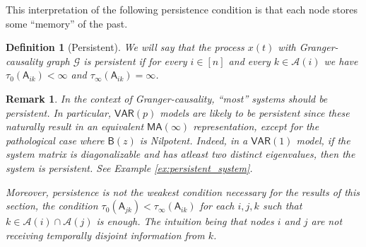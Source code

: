 \documentclass{statsoc}
\def\gcg{\mathcal{G}}  %
\def\VAR{\mathsf{VAR}}  %
\def\B{\mathsf{B}}  %
\def\A{\mathsf{A}}  %
\newcommand{\anc}[1]{\mathcal{A}(#1)}  %
\newtheorem{remark}{Remark}
\newtheorem{definition}{Definition}
\begin{document}
This interpretation of the following persistence condition is that
each node stores some ``memory'' of the past.

\begin{definition}[Persistent]
  We will say that the process $x(t)$ with Granger-causality graph
  $\gcg$ is \textit{persistent} if for every $i \in [n]$ and every
  $k \in \anc{i}$ we have $\tau_0(\A_{ik}) < \infty$ and $\tau_\infty(\A_{ik}) = \infty$.
\end{definition}

\begin{remark}
  In the context of Granger-causality, ``most'' systems should be
  persistent.  In particular, $\mathsf{\VAR}(p)$ models are likely to
  be persistent since these naturally result in an equivalent
  $\mathsf{MA}(\infty)$ representation, except for the pathological case
  where $\B(z)$ is Nilpotent.  Indeed, in a $\VAR(1)$ model, if the
  system matrix is diagonalizable and has atleast two distinct
  eigenvalues, then the system is persistent.  See Example
  \ref{ex:persistent_system}.

  Moreover, persistence is not the weakest condition necessary for the
  results of this section, the condition
  $\tau_0(\A_{jk}) < \tau_\infty(\A_{ik})$ for each $i, j, k$ such that
  $k \in \anc{i} \cap \anc{j}$ is enough.  The intuition being that nodes
  $i$ and $j$ are not receiving temporally disjoint information from
  $k$.
\end{remark}
\end{document}
